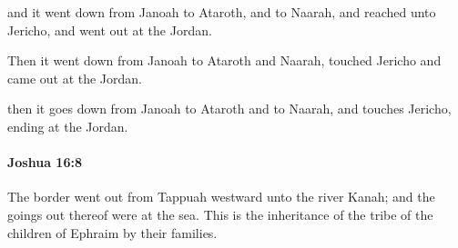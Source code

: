 			\begin{versebox}
					\item[BHS] 
					\item[ASV] and it went down from Janoah to Ataroth, and to Naarah, and reached unto Jericho, and went out at the Jordan.
					\item[NIV] Then it went down from Janoah to Ataroth and Naarah, touched Jericho and came out at the Jordan.
					\item[NRSV] then it goes down from Janoah to Ataroth and to Naarah, and touches Jericho, ending at the Jordan.
			\end{versebox}

		\paragraph{Joshua 16:8} %
			\label{JOSHUA-16-8}

			The border went out from Tappuah westward unto the river Kanah; and the goings out thereof were at the sea. This is the inheritance of the tribe of the children of Ephraim by their families.

